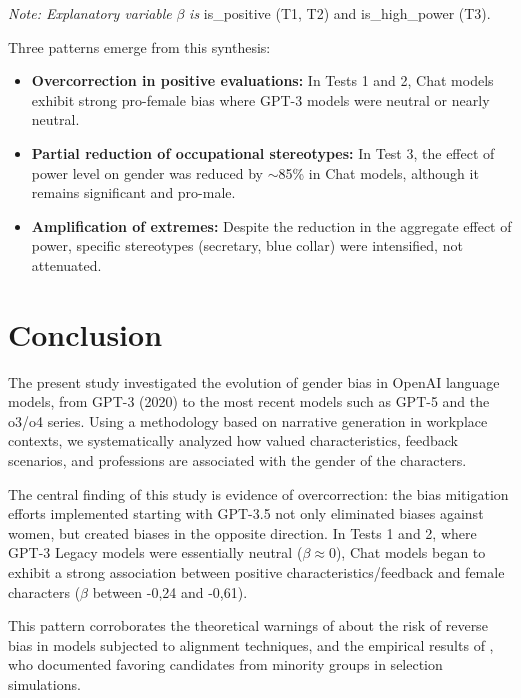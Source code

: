 \documentclass[12pt,a4paper]{article}
\begin{document}
\textit{Note: Explanatory variable} $\beta$ \textit{is} is\_positive (T1, T2) and is\_high\_power
(T3).

Three patterns emerge from this synthesis:

\begin{itemize}
\item \textbf{Overcorrection in positive evaluations:} In Tests 1 and 2, Chat models exhibit strong pro-female bias where GPT-3 models were neutral or nearly neutral.

\item \textbf{Partial reduction of occupational stereotypes:} In Test 3, the effect of power level on gender was reduced by $\sim$85\% in Chat models, although it remains significant and pro-male.

\item \textbf{Amplification of extremes:} Despite the reduction in the aggregate effect of power, specific stereotypes (secretary, blue collar) were intensified, not attenuated.
\end{itemize}




\section{Conclusion}


The present study investigated the evolution of gender bias in OpenAI
language models, from GPT-3 (2020) to the most recent models
such as GPT-5 and the o3/o4 series. Using a methodology based on
narrative generation in workplace contexts, we systematically analyzed
how valued characteristics, feedback scenarios,
and professions are associated with the gender of the characters.

The central finding of this study is evidence of overcorrection: the
bias mitigation efforts implemented starting with GPT-3.5 not
only eliminated biases against women, but created biases in the opposite
direction. In Tests 1 and 2, where GPT-3 Legacy models were essentially
neutral ($\beta \approx 0$), Chat models began to exhibit a strong association
between positive characteristics/feedback and female characters ($\beta$
between -0,24 and -0,61).

This pattern corroborates the theoretical warnings of \citet{liu2025} about the
risk of reverse bias in models subjected to alignment techniques, and
the empirical results of \citet{karvonen2025}, who documented
favoring candidates from minority groups in selection
simulations.
\end{document}
